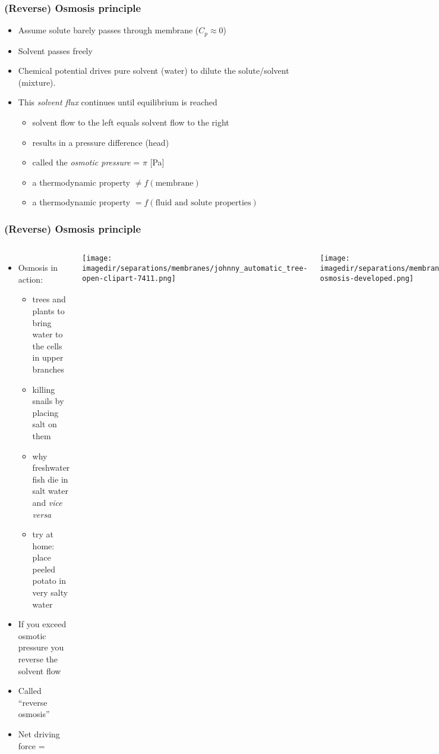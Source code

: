 \begin{frame}\frametitle{(Reverse) Osmosis principle}
	\begin{itemize}
		\item	Assume solute barely passes through membrane ($C_p \approx 0$)
		\item	Solvent passes freely
		\item	Chemical potential drives pure solvent (water) to dilute the solute/solvent (mixture). 
		\item	This \emph{solvent flux} continues until equilibrium is reached
			\begin{itemize}
				\item	solvent flow to the left equals solvent flow to the right
				\item	results in a pressure difference (head)
				\item	called the \emph{osmotic pressure} = $\pi$ [Pa]
				\item	a thermodynamic property $\neq f(\text{membrane})$
				\item	a thermodynamic property $= f(\text{fluid and solute properties})$
			\end{itemize}
	\end{itemize}	
\end{frame}

\begin{frame}\frametitle{(Reverse) Osmosis principle}
	\begin{columns}[t]
			\begin{itemize}
				\item	Osmosis in action:
				\begin{itemize}
					\item	trees and plants to bring water to the cells in upper branches
					\item	killing snails by placing salt on them
					\item	why freshwater fish die in salt water and \emph{vice versa}
					\item	try at home: place peeled potato in very salty water
				\end{itemize}
				\item	If you exceed osmotic pressure you reverse the solvent flow
				\item	Called ``reverse osmosis''
				\item	Net driving force = \underline{$\qquad\qquad\qquad$}
			\end{itemize}
			\vspace{-1cm}
			\begin{center}
				\texttt{[image: \\imagedir/separations/membranes/johnny\_automatic\_tree-open-clipart-7411.png]}
			\end{center}
			\begin{center}
				\texttt{[image: \\imagedir/separations/membranes/reverse-osmosis-developed.png]}
			\end{center}
	\end{columns}	
\end{frame}

